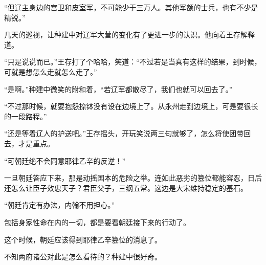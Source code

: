 “但辽主身边的宫卫和皮室军，不可能少于三万人。其他军额的士兵，也有不少是精锐。”

几天的巡视，让种建中对辽军大营的变化有了更进一步的认识。他向着王存解释道。

“只是说说而已。”王存打了个哈哈，笑道：“不过若是当真有这样的结果，到时候，可就是想怎么走就怎么走了。”

“是啊。”种建中微笑的附和着，“若辽军都散尽了，我们也就可以回去了。”

“不过那时候，就要抱怨捺钵没有设在边境上了。从永州走到边境上，可是要很长的一段路程。”

“还是等着辽人的护送吧。”王存摇头，开玩笑说两三句就够了，怎么将使团带回去，才是重点。

“可朝廷绝不会同意耶律乙辛的反逆！”

一旦朝廷答应下来，那是动摇国本的危险之举。连如此恶劣的篡位都能容忍，日后还怎么让臣子效忠天子？君臣父子，三纲五常。这边是大宋维持稳定的基石。

“朝廷肯定有办法，内翰不用担心。”

包括身家性命在内的一切，都是要看朝廷接下来的行动了。

这个时候，朝廷应该得到耶律乙辛篡位的消息了。

不知两府诸公对此是怎么看待的？种建中很好奇。
